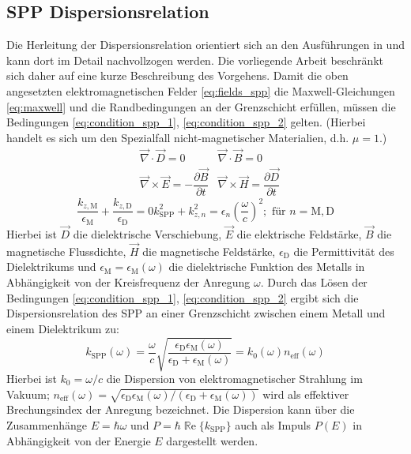 \documentclass[a4paper, titlepage,  ngerman]{book}
\renewcommand{\Re}{\operatorname{\mathbb{R}e}}
\begin{document}
	\subsection{SPP Dispersionsrelation}
	Die Herleitung der Dispersionsrelation orientiert sich an den Ausführungen in \cite[pp.~261ff]{Fox.2020} und kann dort im Detail nachvollzogen werden. Die vorliegende Arbeit beschränkt sich daher auf eine kurze Beschreibung des Vorgehens. Damit die oben angesetzten elektromagnetischen Felder \eqref{eq:fields_spp}  die Maxwell-Gleichungen \eqref{eq:maxwell} und die Randbedingungen an der Grenzschicht erfüllen, müssen die Bedingungen \eqref{eq:condition_spp_1},  \eqref{eq:condition_spp_2} gelten. (Hierbei handelt es sich um den Spezialfall nicht-magnetischer Materialien, d.h. $\mu = 1$.)
	\begin{align}
		\label{eq:maxwell}	
		&\vec{\nabla}\cdot\vec{D} = 0		&\vec{\nabla}\cdot\vec{B} = 0 \\
		&\vec{\nabla}\times\vec{E} = -\dfrac{\partial\vec{B}}{\partial t} 
		&\vec{\nabla}\times\vec{H} = 	\dfrac{\partial\vec{D}}{\partial t}\nonumber
	\end{align}
	\begin{subequations}
		\begin{equation}
			\label{eq:condition_spp_1}
			\dfrac{k_{z, \mathrm{M}}}{\epsilon_\mathrm{M}} + \dfrac{k_{z, \mathrm{D}}}{\epsilon_\mathrm{D}} = 0
		\end{equation}		
		\begin{equation}
			\label{eq:condition_spp_2}
			k_{\mathrm{SPP}}^2 +k_{z, n}^2 = \epsilon_n\left(\dfrac{\omega}{c}\right)^2; \text{ für  } n=\mathrm{M,D}
		\end{equation}
	\end{subequations}
	Hierbei ist $\vec{D}$ die dielektrische Verschiebung, $\vec{E}$ die elektrische Feldstärke, $\vec{B}$ die magnetische Flussdichte, $\vec{H}$ die magnetische Feldstärke, 	$\epsilon_\mathrm{D}$ die Permittivität des Dielektrikums und $\epsilon_\mathrm{M} = \epsilon_\mathrm{M}(\omega)$ die dielektrische Funktion des Metalls in Abhängigkeit von der Kreisfrequenz der Anregung $\omega$. Durch das Lösen der Bedingungen \eqref{eq:condition_spp_1},  \eqref{eq:condition_spp_2} ergibt sich die Dispersionsrelation des SPP an einer Grenzschicht zwischen einem Metall und einem Dielektrikum zu: 
	\begin{equation}
		\label{eq:dispersion_spp}
		\boxed{
			k_{\mathrm{SPP}}\left(\omega\right) = \dfrac{\omega}{c} \sqrt{\dfrac{\epsilon_\mathrm{D}\epsilon_\mathrm{M}(\omega)}{\epsilon_\mathrm{D} + 	\epsilon_\mathrm{M}(\omega)}}  = k_0(\omega) n_{\mathrm{eff}}(\omega)}
	\end{equation}
	Hierbei ist $k_0 = \omega / c$ die Dispersion von elektromagnetischer Strahlung im Vakuum; $n_{\mathrm{eff}}(\omega) = \sqrt{\epsilon_\mathrm{D}\epsilon_\mathrm{M}(\omega)/(\epsilon_\mathrm{D} + 	\epsilon_\mathrm{M}(\omega))}$ wird als effektiver Brechungsindex der Anregung bezeichnet. Die Dispersion kann über die Zusammenhänge $E = \hbar \omega$ und $P = \hbar \Re\{k_\mathrm{SPP}\}$ auch als Impuls $P(E)$ in Abhängigkeit von der Energie $E$ dargestellt werden.
	
\end{document}
